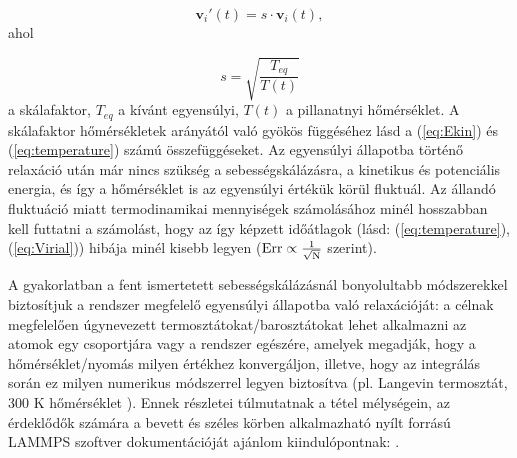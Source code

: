 \documentclass[12pt]{article}
\theoremstyle{plain}
\begin{document}
\begin{equation}
	\mathbf{v}_i'(t) = s \cdot \mathbf{v}_i(t),
\end{equation}
ahol

\begin{equation}
	s = \sqrt{\frac{T_{eq}}{T(t)}}
\end{equation}
a skálafaktor, $T_{eq}$ a kívánt egyensúlyi, $T(t)$ a pillanatnyi hőmérséklet. A skálafaktor hőmérsékletek arányától való gyökös függéséhez lásd a (\ref{eq:Ekin}) és (\ref{eq:temperature}) számú összefüggéseket. Az egyensúlyi állapotba történő relaxáció után már nincs szükség a sebességskálázásra, a kinetikus és potenciális energia, és így a hőmérséklet is az egyensúlyi értékük körül fluktuál. Az állandó fluktuáció miatt termodinamikai mennyiségek számolásához minél hosszabban kell futtatni a számolást, hogy az így képzett időátlagok (lásd: (\ref{eq:temperature}), (\ref{eq:Virial})) hibája minél kisebb legyen ($\rm{Err} \propto \frac{1}{\sqrt{N}}$ szerint).

A gyakorlatban a fent ismertetett sebességskálázásnál bonyolultabb módszerekkel biztosítjuk a rendszer megfelelő egyensúlyi állapotba való relaxációját: a célnak megfelelően úgynevezett termosztátokat/barosztátokat lehet alkalmazni az atomok egy csoportjára vagy a rendszer egészére, amelyek megadják, hogy a hőmérséklet/nyomás milyen értékhez konvergáljon, illetve, hogy az integrálás során ez milyen numerikus módszerrel legyen biztosítva (pl. Langevin termosztát, 300 K hőmérséklet \cite{LAMMPS_fix_langevin}). Ennek részletei túlmutatnak a tétel mélységein, az érdeklődők számára a bevett és széles körben alkalmazható nyílt forrású LAMMPS szoftver dokumentációját ajánlom kiindulópontnak: \cite{LAMMPS_howto_thermostat, LAMMPS_howto_barostat}.




%
%

\end{document}
